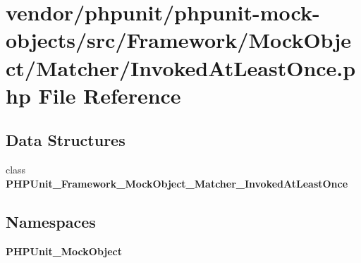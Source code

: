 \section{vendor/phpunit/phpunit-\/mock-\/objects/src/\+Framework/\+Mock\+Object/\+Matcher/\+Invoked\+At\+Least\+Once.php File Reference}
\label{_invoked_at_least_once_8php}
\subsection*{Data Structures}
\begin{DoxyCompactItemize}
\item 
class {\bf P\+H\+P\+Unit\+\_\+\+Framework\+\_\+\+Mock\+Object\+\_\+\+Matcher\+\_\+\+Invoked\+At\+Least\+Once}
\end{DoxyCompactItemize}
\subsection*{Namespaces}
\begin{DoxyCompactItemize}
\item 
 {\bf P\+H\+P\+Unit\+\_\+\+Mock\+Object}
\end{DoxyCompactItemize}
